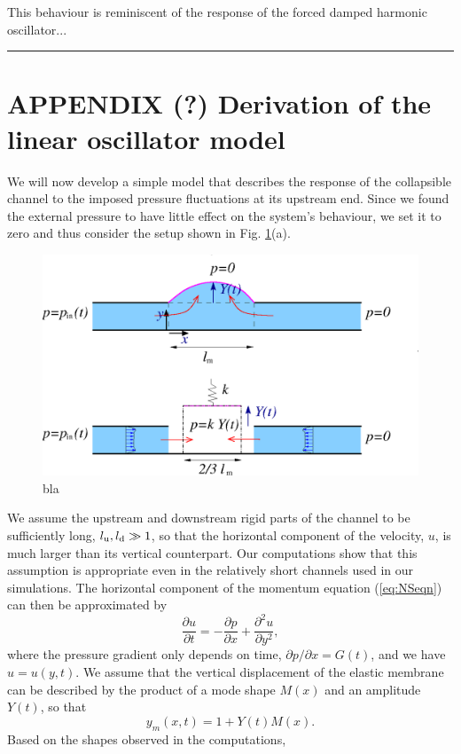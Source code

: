\documentclass[aps,prl,reprint,superscriptaddress,floatfix]{revtex4-1}
\newcommand{\be}{\begin{equation}}
\newcommand{\ee}{\end{equation}}
\begin{document}
This behaviour is reminiscent of the response of the forced damped
harmonic oscillator...


\hrule


\newpage


\section{APPENDIX (?) Derivation of the linear oscillator model}
We will now develop a simple model that describes the response
of the collapsible channel to the imposed pressure fluctuations at
its upstream end. Since we found the external pressure to have
little effect on the system's behaviour, we set it to
zero and thus consider the setup shown in Fig. \ref{model.png}(a).
\begin{figure}
\includegraphics[width=0.99\linewidth]{pictures/model.png}
\caption{\label{model.png}bla}
\end{figure}
  We assume the upstream and downstream rigid parts of
the channel to be sufficiently long, $l_{\rm u}, l_{\rm d} \gg 1$, so that the 
horizontal component of the velocity, $u$, is much larger
than its vertical counterpart. Our computations
show that this assumption is appropriate even in the relatively
short channels used in our simulations. The horizontal component of
the momentum equation (\ref{eq:NSeqn}) can then be approximated by 
\be
\label{long_wavelength_momentum}
\frac{\partial u}{\partial t} = -\frac{\partial p}{\partial x} +
\frac{\partial^2 u}{\partial y^2},
\ee
where the pressure gradient only depends on time, 
$\partial p/\partial x = G(t)$, and we have $u=u(y,t)$. We assume that the
vertical displacement of the elastic membrane can be described by the
product of a mode shape $M(x)$ and an amplitude $Y(t)$, so that
\be
y_m(x,t) = 1+ Y(t) M(x).
\ee
Based on the shapes observed in the computations,
\end{document}
